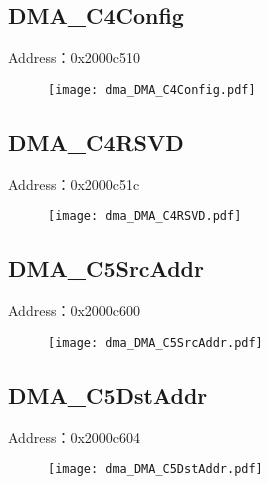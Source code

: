 \subsection{DMA\_C4Config}
\label{dma-DMA-C4Config}
Address：0x2000c510
 \begin{figure}[H]
\texttt{[image: dma\_DMA\_C4Config.pdf]}
\end{figure}

\subsection{DMA\_C4RSVD}
\label{dma-DMA-C4RSVD}
Address：0x2000c51c
 \begin{figure}[H]
\texttt{[image: dma\_DMA\_C4RSVD.pdf]}
\end{figure}

\subsection{DMA\_C5SrcAddr}
\label{dma-DMA-C5SrcAddr}
Address：0x2000c600
 \begin{figure}[H]
\texttt{[image: dma\_DMA\_C5SrcAddr.pdf]}
\end{figure}

\subsection{DMA\_C5DstAddr}
\label{dma-DMA-C5DstAddr}
Address：0x2000c604
 \begin{figure}[H]
\texttt{[image: dma\_DMA\_C5DstAddr.pdf]}
\end{figure}

